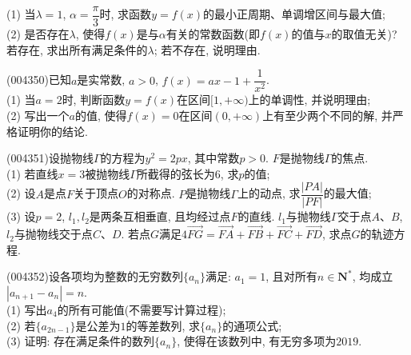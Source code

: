 (1) 当$\lambda=1$, $\alpha=\dfrac{\pi}3$时, 求函数$y=f(x)$的最小正周期、单调增区间与最大值;\\
(2) 是否存在$\lambda$, 使得$f(x)$是与$\alpha$有关的常数函数(即$f(x)$的值与$x$的取值无关)? 若存在, 求出所有满足条件的$\lambda$; 若不存在, 说明理由.
\item (004350)已知$a$是实常数, $a>0$, $f(x)=ax-1+\dfrac 1{x^2}$.\\
(1) 当$a=2$时, 判断函数$y=f(x)$在区间$[1,+\infty)$上的单调性, 并说明理由;\\
(2) 写出一个$a$的值, 使得$f(x)=0$在区间$(0,+\infty)$上有至少两个不同的解, 并严格证明你的结论.
\item (004351)设抛物线$\Gamma$的方程为$y^2=2px$, 其中常数$p>0$. $F$是抛物线$\Gamma$的焦点.\\
(1) 若直线$x=3$被抛物线$\Gamma$所截得的弦长为$6$, 求$p$的值;\\
(2) 设$A$是点$F$关于顶点$O$的对称点. $P$是抛物线$\Gamma$上的动点, 求$\dfrac{|PA|}{|PF|}$的最大值;\\
(3) 设$p=2$, $l_1,l_2$是两条互相垂直, 且均经过点$F$的直线. $l_1$与抛物线$\Gamma$交于点$A$、$B$, $l_2$与抛物线交于点$C$、$D$. 若点$G$满足$4\overrightarrow{FG}=\overrightarrow{FA}+\overrightarrow{FB}+\overrightarrow{FC}+\overrightarrow{FD}$, 求点$G$的轨迹方程.
\item (004352)设各项均为整数的无穷数列$\{a_n\}$满足: $a_1=1$, 且对所有$n\in \mathbf{N}^*$, 均成立$|a_{n+1}-a_n|=n$.\\
(1) 写出$a_4$的所有可能值(不需要写计算过程);\\
(2) 若$\{a_{2n-1}\}$是公差为$1$的等差数列, 求$\{{a_n}\}$的通项公式;\\
(3) 证明: 存在满足条件的数列$\{a_n\}$, 使得在该数列中, 有无穷多项为$2019$.
